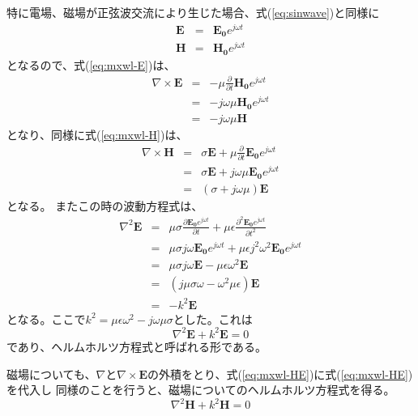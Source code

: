 特に電場、磁場が正弦波交流により生じた場合、式(\ref{eq:sinwave})と同様に
\begin{eqnarray*}
\bm{E} &=& \bm{E_0}e^{j\omega t}\\
\bm{H} &=& \bm{H_0}e^{j\omega t}
\end{eqnarray*}
となるので、式(\ref{eq:mxwl-E})は、
\begin{eqnarray}
\nabla \times \bm{E} &=& -\mu \frac{\partial}{\partial t}\bm{H_0}e^{j\omega t} \nonumber\\
&=& -j\omega\mu\bm{H_0}e^{j\omega t} \nonumber\\
&=& -j\omega \mu \bm{H} \label{eq:mxwl_rotE}
\end{eqnarray}
となり、同様に式(\ref{eq:mxwl-H})は、
\begin{eqnarray}
\nabla \times \bm{H} &=& \sigma \bm{E} + \mu \frac{\partial}{\partial t}\bm{E_0}e^{j\omega t} \nonumber\\
&=& \sigma\bm{E} + j\omega\mu\bm{E_0}e^{j\omega t} \nonumber\\
&=& (\sigma + j\omega \mu) \bm{E} \label{eq:mxwl_rotH}
\end{eqnarray}
となる。
またこの時の波動方程式は、
\begin{eqnarray*}
\nabla^2 \bm{E} &=& \mu \sigma\frac{\partial\bm{E_0}e^{j\omega t}}{\partial t} + \mu\epsilon\frac{\partial^2 \bm{E_0}e^{j\omega t}}{\partial t^2}\\
&=& \mu \sigma j\omega \bm{E_0}e^{j \omega t} + \mu\epsilon j^2 \omega^2 \bm{E_0}e^{j \omega t} \\
&=&\mu \sigma j\omega \bm{E} - \mu\epsilon \omega^2 \bm{E}\\
&=& (j\mu\sigma\omega - \omega^2\mu\epsilon)\bm{E}\\
&=& -k^2\bm{E}
\end{eqnarray*}
となる。ここで$k^2= \mu\epsilon \omega^2 -j\omega\mu\sigma$とした。これは
\begin{equation}
\nabla^2\bm{E} + k^2\bm{E} = 0
\end{equation}
であり、ヘルムホルツ方程式と呼ばれる形である。

磁場についても、$\nabla$と$\nabla\times\bm{E}$の外積をとり、式(\ref{eq:mxwl-HE})に式(\ref{eq:mxwl-HE})を代入し
同様のことを行うと、磁場についてのヘルムホルツ方程式を得る。
\begin{equation}
\nabla^2\bm{H} + k^2\bm{H} = 0
\end{equation}


